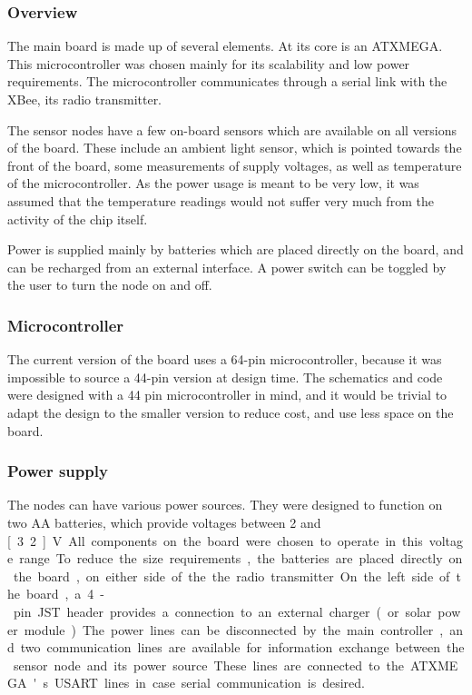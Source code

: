 \subsubsection{Overview}

The main board is made up of several elements. At its core is an ATXMEGA. This
microcontroller was chosen mainly for its scalability and low power
requirements. The microcontroller communicates through a serial link with the
XBee, its radio transmitter.

The sensor nodes have a few on-board sensors which are available on all versions
of the board. These include an ambient light sensor, which is pointed towards
the front of the board, some measurements of supply voltages, as well as
temperature of the microcontroller. As the power usage is meant to be very low,
it was assumed that the temperature readings would not suffer very much from
the activity of the chip itself.

Power is supplied mainly by batteries which are placed directly on the board,
and can be recharged from an external interface. A power switch can be toggled
by the user to turn the node on and off.

\subsubsection{Microcontroller}

The current version of the board uses a 64-pin microcontroller, because it
was impossible to source a 44-pin version at design time. The schematics and
code were designed with a 44 pin microcontroller in mind, and it would be
trivial to adapt the design to the smaller version to reduce cost, and use less
space on the board.


\subsubsection{Power supply}
The nodes can have various power sources. They were designed to function on two
AA batteries, which provide voltages between 2 and \unit[3.2]{V}. All components on
the board were chosen to operate in this voltage range.

To reduce the size requirements, the batteries are placed directly on the board,
on either side of the the radio transmitter.

On the left side of the board, a 4-pin JST header provides a connection to an
external charger (or solar power module). The power lines can be disconnected by
the main controller, and two communication lines are available for information
exchange between the sensor node and its power source. These lines are connected
to the ATXMEGA's USART lines in case serial communication is desired.

